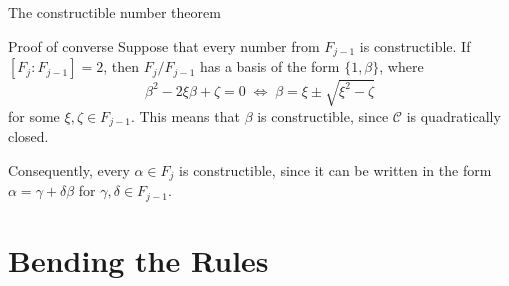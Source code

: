 \documentclass[handout]{beamer}
\begin{document}
    \begin{frame}{The constructible number theorem}
        \begin{block}{Proof of converse} \vspace{0.1em}
            Suppose that every number from $F_{j - 1}$ is constructible.
            If $[F_j : F_{j - 1}] = 2$, then $F_j/F_{j - 1}$ has a basis of the form
            $\{1, \beta\}$, where \[
                \beta^2 - 2\xi\beta + \zeta = 0 \;\Longleftrightarrow\;
                \beta = \xi \pm \sqrt{\xi^2 - \zeta}
            \] for some $\xi, \zeta \in F_{j - 1}$. This means that $\beta$ is
            constructible, since $\mathscr{C}$ is quadratically closed.

            Consequently, every $\alpha \in F_j$ is constructible, since it can be
            written in the form $\alpha = \gamma + \delta\beta$ for $\gamma, \delta
            \in F_{j - 1}$.
        \end{block}
    \end{frame}


    \section{Bending the Rules}
\end{document}
